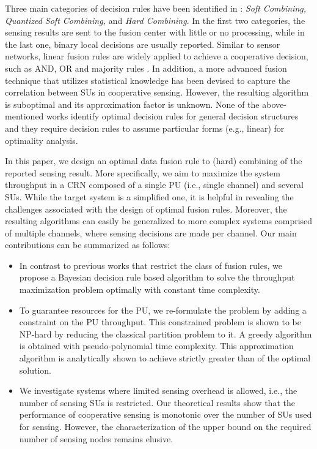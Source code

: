 \documentclass[conference]{IEEEtran}
\begin{document}
Three main categories of decision rules have been identified in \cite{survey}: \emph{Soft Combining, Quantized Soft Combining,} and \emph{Hard
Combining}. In the first two categories, the sensing results are sent
to the fusion center with little or no processing, while in the last
one, binary local decisions are usually reported.  Similar to sensor
networks, linear fusion rules are widely applied to achieve a
cooperative decision, such as AND, OR and majority rules \cite{5169958}. In
addition, a more advanced fusion technique that utilizes statistical
knowledge \cite{4453896} has been devised to capture the correlation between SUs
in cooperative sensing. However, the resulting algorithm is suboptimal
and its approximation factor is unknown. None of the above-mentioned
works identify optimal decision rules for general decision structures
and they require decision rules to assume particular forms (e.g., linear)
for optimality analysis.

In this paper, we design an optimal data fusion rule to (hard)
combining of the reported sensing result. More specifically, we aim to
maximize the system throughput in a CRN composed of a single PU (i.e.,
single channel) and several SUs. While the target system is a
simplified one, it is helpful in revealing the challenges associated
with the design of optimal fusion rules.  Moreover, the resulting
algorithms can easily be generalized to more complex systems comprised
of multiple channels, where sensing decisions are made per
channel. Our main contributions can be summarized as follows:

\begin{itemize}
\item In contrast to previous works that restrict the class of fusion rules, we propose a Bayesian decision rule based algorithm
to solve the throughput maximization problem optimally
with constant time complexity.
 
\item To guarantee resources for the PU, we re-formulate the
problem by adding a constraint on the PU throughput.
This constrained problem is shown to be NP-hard by reducing the
classical partition problem \cite{Garey} to it. A greedy algorithm is
obtained with pseudo-polynomial time complexity. This
approximation algorithm is analytically shown to achieve strictly greater than  of the optimal solution.

\item We investigate systems where limited sensing overhead
is allowed, i.e., the number of sensing SUs is
restricted. Our theoretical results show
that the performance of cooperative sensing is monotonic
over the number of SUs used for sensing. However, the characterization
of the upper bound on the required number of sensing nodes remains
elusive.
  
\end{itemize}    
\end{document}
